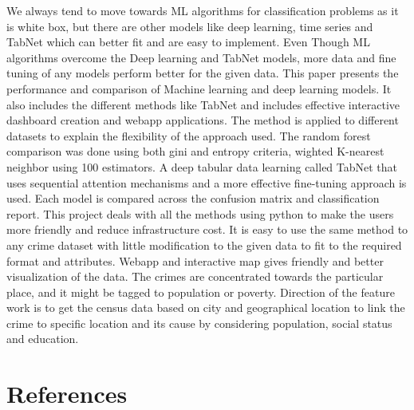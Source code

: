 \documentclass[conference,final,]{IEEEtran}
\begin{document}
We always tend to move towards ML algorithms for classification problems
as it is white box, but there are other models like deep learning, time
series and TabNet which can better fit and are easy to implement. Even
Though ML algorithms overcome the Deep learning and TabNet models, more
data and fine tuning of any models perform better for the given data.
This paper presents the performance and comparison of Machine learning
and deep learning models. It also includes the different methods like
TabNet and includes effective interactive dashboard creation and webapp
applications. The method is applied to different datasets to explain the
flexibility of the approach used. The random forest comparison was done
using both gini and entropy criteria, wighted K-nearest neighbor using
100 estimators. A deep tabular data learning called TabNet that uses
sequential attention mechanisms and a more effective fine-tuning
approach is used. Each model is compared across the confusion matrix and
classification report. This project deals with all the methods using
python to make the users more friendly and reduce infrastructure cost.
It is easy to use the same method to any crime dataset with little
modification to the given data to fit to the required format and
attributes. Webapp and interactive map gives friendly and better
visualization of the data. The crimes are concentrated towards the
particular place, and it might be tagged to population or poverty.
Direction of the feature work is to get the census data based on city
and geographical location to link the crime to specific location and its
cause by considering population, social status and education.

\section*{References}\label{references}
\end{document}
